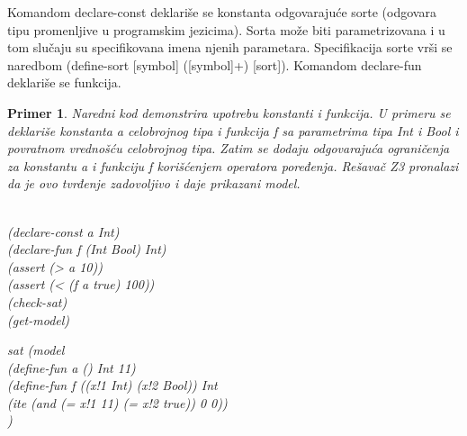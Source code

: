 \documentclass[12pt,oneside]{memoir}
\newtheorem{primer}{Primer}
\begin{document}
Komandom declare-const deklariše se konstanta odgovarajuće sorte (odgovara tipu promenljive u programskim jezicima). Sorta može biti parametrizovana i u tom slučaju su specifikovana imena njenih parametara. Specifikacija sorte vrši se naredbom (define-sort [symbol] ([symbol]+) [sort]).
Komandom declare-fun deklariše se funkcija. 


\begin{primer} Naredni kod demonstrira upotrebu konstanti i funkcija. U primeru se deklariše konstanta a celobrojnog tipa i funkcija f sa parametrima tipa Int i Bool i povratnom vrednošću celobrojnog tipa. Zatim se dodaju odgovarajuća ograničenja za konstantu a i funkciju f korišćenjem operatora poređenja. Rešavač Z3 pronalazi da je ovo tvrđenje zadovoljivo i daje prikazani model. 
\\ \\

\hspace{-0.7cm}
\begin{minipage}[b]{0.4\textwidth}
(declare-const a Int)\\
(declare-fun f (Int Bool) Int)\\
(assert (> a 10))\\
(assert (< (f a true) 100))\\
(check-sat)\\
(get-model) \\
\end{minipage}
\hspace{1cm}
\begin{minipage}[b]{0.4\textwidth}
sat (model 
\\(define-fun a () Int 11) 
\\(define-fun f ((x!1 Int) (x!2 Bool)) Int 
\\(ite (and (= x!1 11) (= x!2 true)) 0 0)) 
\\)
\end{minipage}
\end{primer}
\end{document}
